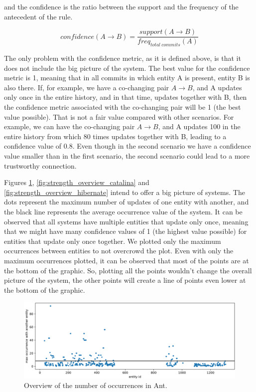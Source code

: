 \documentclass[runningheads]{comsis2}
\begin{document}
and the confidence is the ratio between the support and the frequency of the antecedent of the rule.

\begin{equation}
confidence (A \rightarrow B) =\frac{support (A \rightarrow B) }{freq_{total\ commits}(A)}
\end{equation}


The only problem with the confidence metric, as it is defined above, is that it does not include the big picture of the system.
The best value for the confidence metric is 1, meaning that in all commits in which entity A is present, entity B is also there. If, for example, we have a co-changing pair $A \rightarrow B$, and A updates only once in the entire history, and in that time, updates together with B, then the confidence metric associated with the co-changing pair will be 1 (the best value possible). That is not a fair value compared with other scenarios. For example, we can have the co-changing pair $A \rightarrow B$, and A updates 100 in the entire history from which 80 times updates together with B, leading to a confidence value of 0.8.
Even though in the second scenario we have a confidence value smaller than in the first scenario, the second scenario could lead to a more trustworthy connection.

Figures \ref{fig:strength_overview_ant}, \ref{fig:strength_overview_catalina} and \ref{fig:strength_overview_hibernate} intend to offer a big picture of systems. The dots represent the maximum number of updates of one entity with another, and the black line represents the average occurrence value of the system.
It can be observed that all systems have multiple entities that update only once, meaning that we might have many confidence values of 1 (the highest value possible) for entities that update only once together. 
We plotted only the maximum occurrences between entities to not overcrowd the plot. Even with only the maximum occurrences plotted, it can be observed that most of the points are at the bottom of the graphic. So, plotting all the points wouldn't change the overall picture of the system, the other points will create a line of points even lower at the bottom of the graphic.

\begin{figure}
\centering
\includegraphics[width=\textwidth]{fig_ant_maxOcc.png}
\caption{Overview of the number of occurrences in Ant. }
\label{fig:strength_overview_ant}
\centering
\end{figure}
\end{document}
